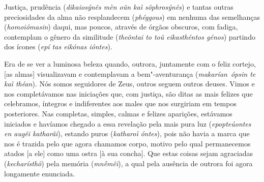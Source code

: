 \bekker{[250b]} Justiça, prudência (\emph{dikaiosýnês mèn oûn kaì
sôphrosýnês}) e tantas outras preciosidades da alma não resplandecem
(\emph{phéggous}) em nenhuma das semelhanças
(\emph{homoiómasin}) daqui, mas poucos, através de órgãos obscuros, com
fadiga, contemplam o gênero da similitude (\emph{theôntai to toû
eikasthéntos génos}) partindo dos ícones (\emph{epí tas eikónas
ióntes}).

Era de se ver a luminosa beleza quando, outrora, juntamente com o feliz
cortejo, [as almas] visualizavam e contemplavam a bem"-aventurança
(\emph{makarían}~\emph{ópsin te kaì théan}). Nós somos seguidores de
Zeus, outros seguem outros deuses. Vimos e nos completávamos nas
iniciações que, com justiça, são ditas as mais felizes que celebramos,
íntegros e indiferentes aos males que nos surgiriam em tempos
posteriores. Nas completas, simples, \bekker{[250c]} calmas e felizes
aparições, estávamos iniciados e havíamos chegado a essa
revelação pela mais pura luz
(\emph{epopteúontes en augêi katharâi}), estando puros (\emph{katharoì
óntes}), pois não havia a marca que nos é trazida pelo que agora
chamamos corpo, motivo pelo qual permanecemos atados [a ele] como
uma ostra [à sua concha]. Que estas coisas sejam agraciadas
(\emph{kecharísthô}) pela memória (\emph{mnḗmêi}), a qual pela ausência de outrora foi
agora longamente enunciada.


